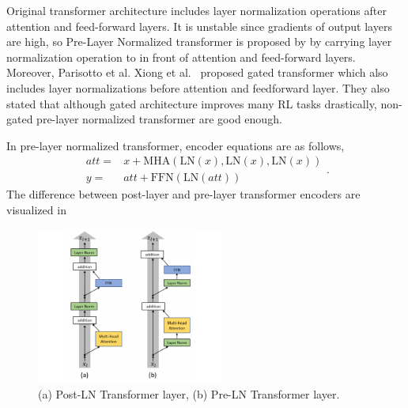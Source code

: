 Original transformer architecture includes layer normalization operations after attention and feed-forward layers. 
It is unstable since gradients of output layers are high, so Pre-Layer Normalized transformer is proposed by \cite{xiong_layer_2020} by carrying layer normalization operation to in front of attention and feed-forward layers. 
Moreover, Parisotto et al. Xiong et al.~ \cite{parisotto_stabilizing_2019} proposed gated transformer which also includes layer normalizations before attention and feedforward layer. 
They also stated that although gated architecture improves many RL tasks drastically, non-gated pre-layer normalized transformer are good enough. 

In pre-layer normalized transformer, encoder equations are as follows,
\begin{equation}
\begin{split}
att = & x+ \mathrm{MHA}(\mathrm{LN}(x),\mathrm{LN}(x),\mathrm{LN}(x)) \\
y = & att+ \mathrm{FFN}(\mathrm{LN}(att))
\end{split}.
\end{equation}
The difference between post-layer and pre-layer transformer encoders are visualized in 

\begin{figure}
	\centering
	\includegraphics[width=0.55\textwidth]{figures/ml_theory/post_pre_trsf.png}
	\caption{(a) Post-LN Transformer layer, (b) Pre-LN Transformer
		layer.}
	\label{fig:post_pre_trsf}
\end{figure}


